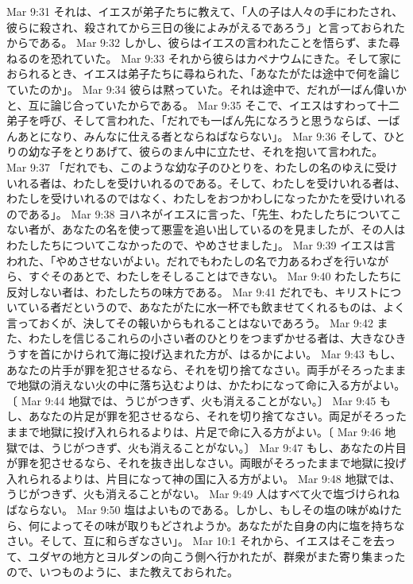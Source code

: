 Mar 9:31  それは、イエスが弟子たちに教えて、「人の子は人々の手にわたされ、彼らに殺され、殺されてから三日の後によみがえるであろう」と言っておられたからである。
Mar 9:32  しかし、彼らはイエスの言われたことを悟らず、また尋ねるのを恐れていた。
Mar 9:33  それから彼らはカペナウムにきた。そして家におられるとき、イエスは弟子たちに尋ねられた、「あなたがたは途中で何を論じていたのか」。
Mar 9:34  彼らは黙っていた。それは途中で、だれが一ばん偉いかと、互に論じ合っていたからである。
Mar 9:35  そこで、イエスはすわって十二弟子を呼び、そして言われた、「だれでも一ばん先になろうと思うならば、一ばんあとになり、みんなに仕える者とならねばならない」。
Mar 9:36  そして、ひとりの幼な子をとりあげて、彼らのまん中に立たせ、それを抱いて言われた。
Mar 9:37  「だれでも、このような幼な子のひとりを、わたしの名のゆえに受けいれる者は、わたしを受けいれるのである。そして、わたしを受けいれる者は、わたしを受けいれるのではなく、わたしをおつかわしになったかたを受けいれるのである」。
Mar 9:38  ヨハネがイエスに言った、「先生、わたしたちについてこない者が、あなたの名を使って悪霊を追い出しているのを見ましたが、その人はわたしたちについてこなかったので、やめさせました」。
Mar 9:39  イエスは言われた、「やめさせないがよい。だれでもわたしの名で力あるわざを行いながら、すぐそのあとで、わたしをそしることはできない。
Mar 9:40  わたしたちに反対しない者は、わたしたちの味方である。
Mar 9:41  だれでも、キリストについている者だというので、あなたがたに水一杯でも飲ませてくれるものは、よく言っておくが、決してその報いからもれることはないであろう。
Mar 9:42  また、わたしを信じるこれらの小さい者のひとりをつまずかせる者は、大きなひきうすを首にかけられて海に投げ込まれた方が、はるかによい。
Mar 9:43  もし、あなたの片手が罪を犯させるなら、それを切り捨てなさい。両手がそろったままで地獄の消えない火の中に落ち込むよりは、かたわになって命に入る方がよい。〔
Mar 9:44  地獄では、うじがつきず、火も消えることがない。〕
Mar 9:45  もし、あなたの片足が罪を犯させるなら、それを切り捨てなさい。両足がそろったままで地獄に投げ入れられるよりは、片足で命に入る方がよい。〔
Mar 9:46  地獄では、うじがつきず、火も消えることがない。〕
Mar 9:47  もし、あなたの片目が罪を犯させるなら、それを抜き出しなさい。両眼がそろったままで地獄に投げ入れられるよりは、片目になって神の国に入る方がよい。
Mar 9:48  地獄では、うじがつきず、火も消えることがない。
Mar 9:49  人はすべて火で塩づけられねばならない。
Mar 9:50  塩はよいものである。しかし、もしその塩の味がぬけたら、何によってその味が取りもどされようか。あなたがた自身の内に塩を持ちなさい。そして、互に和らぎなさい」。
Mar 10:1  それから、イエスはそこを去って、ユダヤの地方とヨルダンの向こう側へ行かれたが、群衆がまた寄り集まったので、いつものように、また教えておられた。
